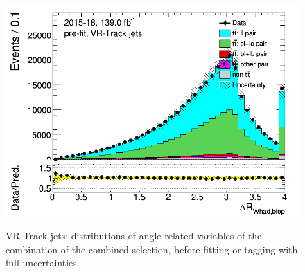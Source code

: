 \begin{figure}[H]
	\includegraphics[width=.45\textwidth]{FTAG_plots/pretagNoRwwithhighpTVRJetsall/DataMC_h_dRWhadbleptrackjet.png} \\
	\caption{VR-Track jets: distributions of angle related variables of the combination 
	of the combined selection, before fitting or tagging with full uncertainties.} \label{fig:combined_angles_VRJets}
	\end{figure}
	
